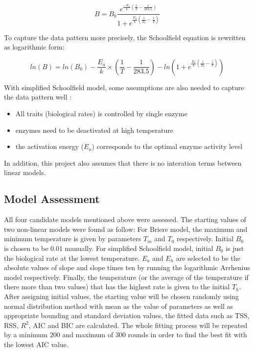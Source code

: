 \documentclass[11pt]{article}
\begin{document}
\begin{equation}
    B = B_0 \frac { e^{\frac{-E_a}{k}(\frac{1}{T} - \frac{1}{283.5})} }
                { 1 + e^{\frac{E_h}{k} (\frac{1}{T_h} - \frac{1}{T}) }}
\end{equation}

To capture the data pattern more precisely, the Schoolfield equation is rewritten as logarithmic form:

\begin{equation}
    ln(B) = ln(B_0) - \frac{E_a}{k} \times (\frac{1}{T} - \frac{1}{283.5}) - ln(1 + e^{\frac{E_h}{k} (\frac{1}{T_h} - \frac{1}{T}) })
\end{equation}

With simplified Schoolfield model, some assumptions are also needed to capture the data pattern well \cite{delong_2017}:

\begin{itemize}
    \item All traits (biological rates) is controlled by single enzyme \cite{delong_2017}
    \item enzymes need to be deactivated at high temperature \cite{delong_2017}
    \item the activation energy ($E_a$) corresponds to the optimal enzyme activity level \cite{delong_2017}
\end{itemize}

In addition, this project also assumes that there is no interation terms between linear models.

\subsection{Model Assessment}

All four candidate models mentioned above were assessed. The starting values of two non-linear models were found as follow:
For Briere model, the maximum and minimum temperature is given by parameters $T_m$ and $T_0$ respectively. Initial $B_0$ is chosen to be 0.01 manually. For simplified Schoolfield model, initial $B_0$ is just the biological rate at the lowest temperature. $E_a$ and  $E_h$ are selected to be the absolute values of slope and slope times ten by running the logarithmic Arrhenius model respectively.  Finally, the temperature (or the average of the temperature if there more than two values) that has the highest rate is given to the initial $T_h$. After assigning initial values, the starting value will be chosen randomly using normal distribution method with mean as the value of parameters as well as appropriate bounding and standard deviation values, the fitted data such as TSS, RSS, $R^2$, AIC and BIC are calculated. The whole fitting process will be repeated by a minimum 200 and maximum of 300 rounds in order to find the best fit with the lowest AIC value.
\end{document}
